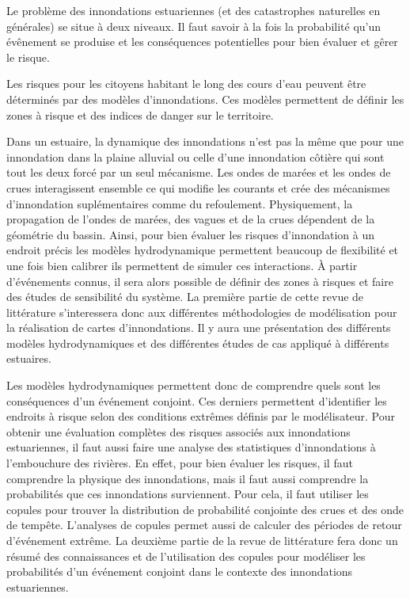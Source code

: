 \documentclass[12pt]{article}   %
\begin{document}
\par
Le problème des innondations estuariennes (et des catastrophes naturelles en générales) se situe à deux niveaux. Il faut savoir à la fois la probabilité qu'un évênement se produise et les conséquences potentielles pour bien évaluer et gêrer le risque.
\par
Les risques pour les citoyens habitant le long des cours d'eau peuvent être déterminés par des modèles d'innondations. Ces modèles permettent de définir les zones à risque et des indices de danger sur le territoire.
\par
Dans un estuaire, la dynamique des innondations n'est pas la même que pour une innondation dans la plaine alluvial ou celle d'une innondation côtière qui sont tout les deux forcé par un seul mécanisme. Les ondes de marées et les ondes de crues interagissent ensemble ce qui modifie les courants et crée des mécanismes d'innondation suplémentaires comme du refoulement. Physiquement, la propagation de l'ondes de marées, des vagues et de la crues dépendent de la géométrie du bassin. Ainsi, pour bien évaluer les risques d'innondation à un endroit précis les modèles hydrodynamique permettent beaucoup de flexibilité et une fois bien calibrer ils permettent de simuler ces interactions. À partir d'événements connus, il sera alors possible de définir des zones à risques et faire des études de sensibilité du système. La première partie de cette revue de littérature s'interessera donc aux différentes méthodologies de modélisation pour la réalisation de cartes d'innondations. Il y aura une présentation des différents modèles hydrodynamiques et des différentes études de cas appliqué à différents estuaires. 
\par
Les modèles hydrodynamiques permettent donc de comprendre quels sont les conséquences d'un événement conjoint. Ces derniers permettent d'identifier les endroits à risque selon des conditions extrêmes définis par le modélisateur. Pour obtenir une évaluation complètes des risques associés aux innondations estuariennes, il faut aussi faire une analyse des statistiques d'innondations à l'embouchure des rivières. En effet, pour bien évaluer les risques, il faut comprendre la physique des innondations, mais il faut aussi comprendre la probabilités que ces innondations surviennent. Pour cela, il faut utiliser les copules pour trouver la distribution de probabilité conjointe des crues et des onde de tempête. L'analyses de copules permet aussi de calculer des périodes de retour d'événement extrême. La deuxième partie de la revue de littérature fera donc un résumé des connaissances et de l'utilisation des copules pour modéliser les probabilités d'un événement conjoint dans le contexte des innondations estuariennes.  
\end{document}
